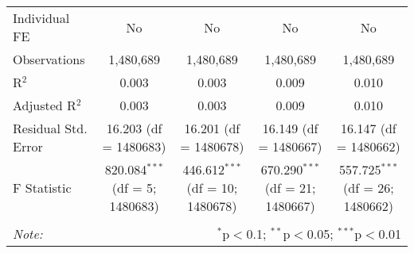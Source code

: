 \documentclass[
]{article}
\begin{document}
\begin{table}[!htbp]
{\begin{tabular}{@{\extracolsep{5pt}}lcccc}
Individual FE & No & No & No & No \\ 
Observations & 1,480,689 & 1,480,689 & 1,480,689 & 1,480,689 \\ 
R$^{2}$ & 0.003 & 0.003 & 0.009 & 0.010 \\ 
Adjusted R$^{2}$ & 0.003 & 0.003 & 0.009 & 0.010 \\ 
Residual Std. Error & 16.203 (df = 1480683) & 16.201 (df = 1480678) & 16.149 (df = 1480667) & 16.147 (df = 1480662) \\ 
F Statistic & 820.084$^{***}$ (df = 5; 1480683) & 446.612$^{***}$ (df = 10; 1480678) & 670.290$^{***}$ (df = 21; 1480667) & 557.725$^{***}$ (df = 26; 1480662) \\ 
\hline 
\hline \\[-1.8ex] 
\textit{Note:}  & \multicolumn{4}{r}{$^{*}$p$<$0.1; $^{**}$p$<$0.05; $^{***}$p$<$0.01} \\ 
\end{tabular}
} 
\end{table} 
\newpage
\end{document}
